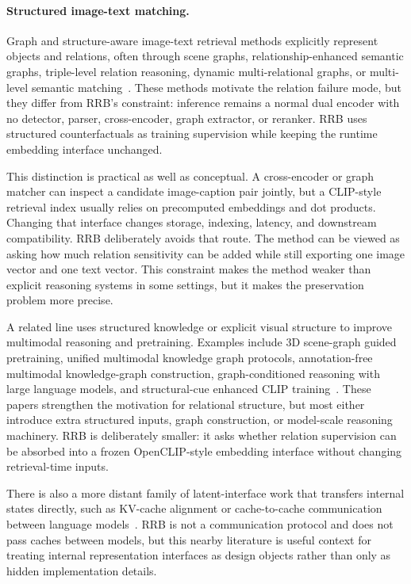 \paragraph{Structured image-text matching.}
Graph and structure-aware image-text retrieval methods explicitly represent objects and relations, often through scene graphs, relationship-enhanced semantic graphs, triple-level relation reasoning, dynamic multi-relational graphs, or multi-level semantic matching~\cite{wang2019crossmodal,liu2024resg,ma2026tsgr2,liu2024semscene,song2025cmrgr,chen2024spatialvlm}. These methods motivate the relation failure mode, but they differ from RRB's constraint: inference remains a normal dual encoder with no detector, parser, cross-encoder, graph extractor, or reranker. RRB uses structured counterfactuals as training supervision while keeping the runtime embedding interface unchanged.

This distinction is practical as well as conceptual. A cross-encoder or graph matcher can inspect a candidate image-caption pair jointly, but a CLIP-style retrieval index usually relies on precomputed embeddings and dot products. Changing that interface changes storage, indexing, latency, and downstream compatibility. RRB deliberately avoids that route. The method can be viewed as asking how much relation sensitivity can be added while still exporting one image vector and one text vector. This constraint makes the method weaker than explicit reasoning systems in some settings, but it makes the preservation problem more precise.

A related line uses structured knowledge or explicit visual structure to improve multimodal reasoning and pretraining. Examples include 3D scene-graph guided pretraining, unified multimodal knowledge graph protocols, annotation-free multimodal knowledge-graph construction, graph-conditioned reasoning with large language models, and structural-cue enhanced CLIP training~\cite{liu20243dscenegraph,gong2024uknow,liu2025valik,sun2026mario,ruan2026structxlip}. These papers strengthen the motivation for relational structure, but most either introduce extra structured inputs, graph construction, or model-scale reasoning machinery. RRB is deliberately smaller: it asks whether relation supervision can be absorbed into a frozen OpenCLIP-style embedding interface without changing retrieval-time inputs.

There is also a more distant family of latent-interface work that transfers internal states directly, such as KV-cache alignment or cache-to-cache communication between language models~\cite{dery2026latentcache,fu2026cachetocache}. RRB is not a communication protocol and does not pass caches between models, but this nearby literature is useful context for treating internal representation interfaces as design objects rather than only as hidden implementation details.

